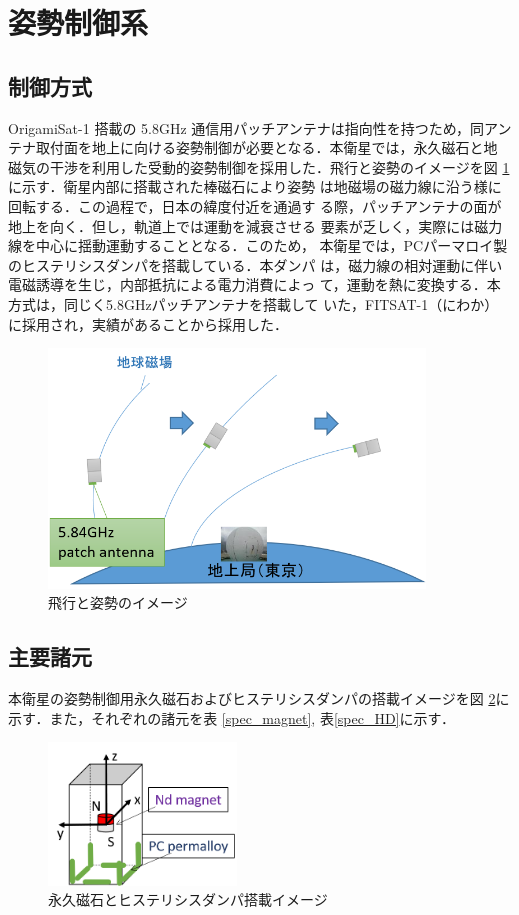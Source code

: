 \section{姿勢制御系}

\subsection{制御方式}
OrigamiSat-1 搭載の 5.8GHz 通信用パッチアンテナは指向性を持つため，同アン
テナ取付面を地上に向ける姿勢制御が必要となる．本衛星では，永久磁石と地
磁気の干渉を利用した受動的姿勢制御を採用した．飛行と姿勢のイメージを図
\ref{image_attitude_ctrl}に示す．衛星内部に搭載された棒磁石により姿勢
は地磁場の磁力線に沿う様に回転する．この過程で，日本の緯度付近を通過す
る際，パッチアンテナの面が地上を向く．但し，軌道上では運動を減衰させる
要素が乏しく，実際には磁力線を中心に揺動運動することとなる．このため，
本衛星では，PCパーマロイ製のヒステリシスダンパを搭載している．本ダンパ
は，磁力線の相対運動に伴い電磁誘導を生じ，内部抵抗による電力消費によっ
て，運動を熱に変換する．本方式は，同じく5.8GHzパッチアンテナを搭載して
いた，FITSAT-1（にわか）に採用され，実績があることから採用した．

\begin{figure}[htbp]
	\centering
	\includegraphics[width=10cm]{./03/fig/image_attitude_ctrl.png}
	\caption{飛行と姿勢のイメージ}
	\label{image_attitude_ctrl}
\end{figure}

\subsection{主要諸元}
本衛星の姿勢制御用永久磁石およびヒステリシスダンパの搭載イメージを図
\ref{image_mag_HD}に示す．また，それぞれの諸元を表
\ref{spec_magnet}, 表\ref{spec_HD}に示す．

\begin{figure}[htbp]
	\centering
	\includegraphics[width=5cm]{./03/fig/image_mag_HD.png}
	\caption{永久磁石とヒステリシスダンパ搭載イメージ}
	\label{image_mag_HD}
\end{figure}

